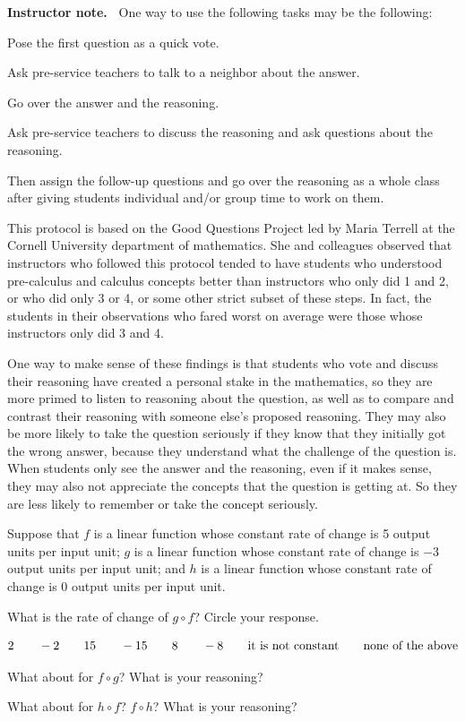 \documentclass[11pt]{article}
\newenvironment{bignote}[1][Instructor note]%
	{\begin{mdframed}\raggedright{\bf #1.~}}
	{\end{mdframed}}
\newenvironment{task}
	{\begin{mdframed}[linecolor=lightgray, linewidth=3pt]\raggedright}
	{\end{mdframed}}
\newcommand\tn{\textnormal}
\theoremstyle{definition}
\begin{document}
\begin{bignote}
One way to use the following tasks may be the following:
	\begin{enumerate*}
	\item Pose the first question as a quick vote. 
	\item Ask pre-service teachers to talk to a neighbor about the answer.
	\item Go over the answer and the reasoning.
	\item Ask pre-service teachers to discuss the reasoning and ask questions about the reasoning.
	\end{enumerate*}
Then assign the follow-up questions and go over the reasoning as a whole class after giving students individual and/or group time to work on them.

This protocol is based on the Good Questions Project led by Maria Terrell at the Cornell University department of mathematics. She and colleagues observed that instructors who followed this protocol tended to have students who understood pre-calculus and calculus concepts better than instructors who only did 1 and 2, or who did only 3 or 4, or some other strict subset of these steps.  In fact, the students in their observations who fared worst on average were those whose instructors only did 3 and 4. 

One way to make sense of these findings is that students who vote and discuss their reasoning have created a personal stake in the mathematics, so they are more primed to listen to reasoning about the question, as well as to compare and contrast their reasoning with someone else's proposed reasoning. They may also be more likely to take the question seriously if they know that they initially got the wrong answer, because they understand what the challenge of the question is. When students only see the answer and the reasoning, even if it makes sense, they may also not appreciate the concepts that the question is getting at. So they are less likely to remember or take the concept seriously. 
\end{bignote}


\begin{task} 
Suppose that $f$ is a linear function whose constant rate of change is 5 output units per input unit; $g$ is a linear function whose constant rate of change is $-3$ output units per input unit; and $h$ is a linear function whose constant rate of change is $0$ output units per input unit.

What is the rate of change of $g\circ f$? Circle your response.

	$$2 \quad\quad -2 \quad\quad 15 \quad\quad -15 \quad\quad 8 \quad\quad -8\quad\quad \tn{it is not constant} \quad\quad \tn{none of the above}$$

What about for $f\circ g$? What is your reasoning? 

What about for $h\circ f$?  $f\circ h$? What is your reasoning?
\end{task}
\end{document}
